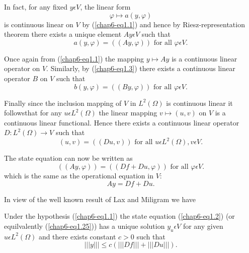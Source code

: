 In fact, for any fixed $y \epsilon V$, the linear form 
$$
\varphi \mapsto a(y, \varphi)
$$
is continuous linear on $V$ by (\ref{chap6-eq1.1}) and hence by
Riesz-representation theorem there exists a unique element $Ay
\epsilon V$ such that 
\begin{equation*}
a(y, \varphi) = ((Ay, \varphi)) \text{ for all } \varphi \epsilon V.\tag{1.22}\label{chap6-eq1.22}
\end{equation*}

Once again from (\ref{chap6-eq1.1}) the mapping $y \mapsto Ay$ is a
continuous linear operator on $V$. Similarly, by (\ref{chap6-eq1.3})
there exists a continuous linear operator $B$ on $V$ such that 
\begin{equation*}
b(y, \varphi) = ((By, \varphi)) \text{ for all } \varphi \epsilon V.\tag{1.23}\label{chap6-eq1.23}
\end{equation*}

Finally since the inclusion mapping of $V$ in $L^{2} (\Omega)$ is
continuous linear it follows\pageoriginale that for any $u \epsilon
L^{2} (\Omega)$ the linear mapping $v \mapsto (u, v)$ on $V$ is a
continuous linear functional. Hence there exists a continuous linear
operator $D : L^{2} (\Omega) \to V$ such that 
\begin{equation*}
(u, v) = ((Du, v)) \text{ for all } u \epsilon L^{2}(\Omega), v \epsilon V.\tag{1.24}\label{chap6-eq1.24}
\end{equation*}

The state equation can now be written as
$$
((Ay, \varphi)) = ((Df + Du, \varphi)) \text{ for all } \varphi \epsilon V.
$$
which is the same as the operational equation in $V$:
\begin{equation*}
Ay = Df + Du.\tag{1.25}\label{chap6-eq1.25}
\end{equation*}

In view of the well known result of Lax and Miligram we have

\begin{theorem}\label{chap6-thm1.3}
Under the hypothesis (\ref{chap6-eq1.1}) the state equation
(\ref{chap6-eq1.2}) (or equilvalently (\ref{chap6-eq1.25})) has a
unique solution $y_{u} \epsilon V$ for any given $u \epsilon L^{2}
(\Omega)$ and there exists constant $c > 0$ such that 
\begin{equation*}
||| y ||| \leq c (||| Df ||| + ||| Du |||).\tag{1.26}\label{chap6-eq1.26}
\end{equation*}
\end{theorem}

